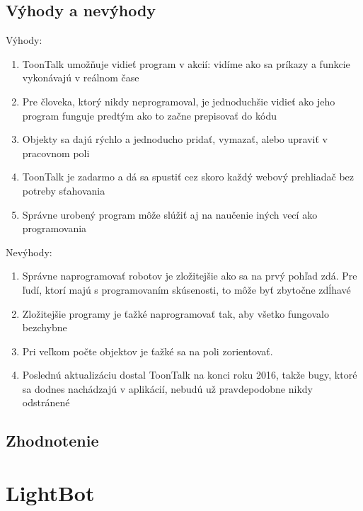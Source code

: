 \documentclass[slovak,a4paper,11pt]{article}
\begin{document}
\subsection{Výhody a nevýhody}
Výhody:
\begin{enumerate}
\item ToonTalk umožňuje vidieť program v akcií: vidíme ako sa príkazy a funkcie vykonávajú v reálnom čase
\item Pre človeka, ktorý nikdy neprogramoval, je jednoduchšie vidieť ako jeho program funguje predtým ako to začne prepisovať do kódu
\item Objekty sa dajú rýchlo a jednoducho pridať, vymazať, alebo upraviť v pracovnom poli 
\item ToonTalk je zadarmo a dá sa spustiť cez skoro každý webový prehliadač bez potreby sťahovania
\item Správne urobený program môže slúžiť aj na naučenie iných vecí ako programovania
\end{enumerate}
Nevýhody:
\begin{enumerate}
\item Správne naprogramovať robotov je zložitejšie ako sa na prvý pohľad zdá. Pre ľudí, ktorí majú s programovaním skúsenosti, to môže byť zbytočne zdĺhavé
\item Zložitejšie programy je ťažké naprogramovať tak, aby všetko fungovalo bezchybne
\item Pri veľkom počte objektov je ťažké sa na poli zorientovať.
\item Poslednú aktualizáciu dostal ToonTalk na konci roku 2016, takže bugy, ktoré sa dodnes nachádzajú v aplikácií, nebudú už pravdepodobne nikdy odstránené
\end{enumerate}
\subsection{Zhodnotenie}

\section{LightBot}
\end{document}
